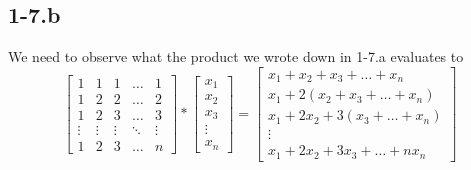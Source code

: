 \documentclass{article}
\begin{document}
\subsection*{1-7.b}
We need to observe what the product we wrote down in 1-7.a evaluates to
\begin{equation*}
   \begin{bmatrix}
        1 & 1 & 1 & \dots & 1 \\
        1 & 2 & 2 & \dots & 2 \\
        1 & 2 & 3 & \dots & 3 \\
        \vdots & \vdots & \vdots &\ddots & \vdots \\
        1 & 2 & 3 & \dots & n
    \end{bmatrix} * \begin{bmatrix}
        x_{1} \\ x_{2} \\ x_{3} \\ \vdots \\ x_{n}
    \end{bmatrix} = 
    \begin{bmatrix}
        x_{1} + x_{2} + x_{3} + \dots + x_{n} \\
        x_{1} + 2\left(x_{2} + x_{3} + \dots + x_{n}\right) \\
        x_{1} + 2x_{2} + 3\left(x_{3} + \dots + x_{n}\right) \\
        \vdots
        \\
        x_{1} + 2x_{2} + 3x_{3} + \dots + nx_{n}
    \end{bmatrix}
\end{equation*}
\end{document}
